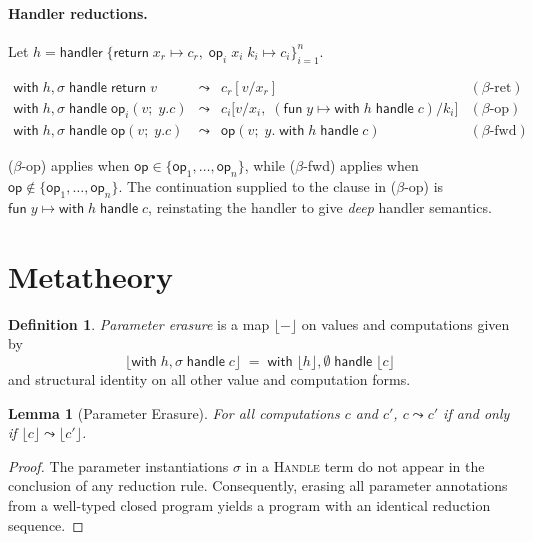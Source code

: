 \documentclass{article}
\newtheorem{lemma}[theorem]{Lemma}
\theoremstyle{definition}
\newtheorem{definition}[theorem]{Definition}
\theoremstyle{remark}
\newcommand{\op}{\mathsf{op}}
\newcommand{\ret}{\mathsf{return}\;}
\newcommand{\fun}{\mathsf{fun}\;}
\newcommand{\hhandler}{\mathsf{handler}}
\newcommand{\with}{\mathsf{with}\;}
\newcommand{\handle}{\;\mathsf{handle}\;}
\begin{document}
\paragraph{Handler reductions.}

Let $h = \hhandler\;\{\ret x_r \mapsto c_r,\;\op_i\;x_i\;k_i \mapsto c_i\}_{i=1}^{n}$.

\[
\begin{array}{lcll}
  \with h, \sigma \handle \ret v
    & \leadsto & c_r[v/x_r]
    & (\beta\text{-ret}) \\[4pt]
    \with h,\sigma \handle \op_i(v;\;y.c)
    & \leadsto & c_i\bigl[v/x_i,\;(\fun y \mapsto \with h \handle c)/k_i\bigr]
    & (\beta\text{-op}) \\[4pt]
  \with h,\sigma \handle \op(v;\;y.c)
    & \leadsto & \op(v;\;y.\;\with h \handle c)
    & (\beta\text{-fwd})
\end{array}
\]

\noindent
($\beta$-op) applies when $\op \in \{\op_1, \ldots, \op_n\}$, while
($\beta$-fwd) applies when $\op \notin \{\op_1, \ldots, \op_n\}$.
The continuation supplied to the clause in ($\beta$-op) is $\fun y \mapsto \with h \handle c$,
reinstating the handler to give \emph{deep} handler semantics.

\section{Metatheory}\label{sec:meta}

\begin{definition}
  \emph{Parameter erasure} is a map $\lfloor - \rfloor$ on values and computations given by
  \[
    \bigl\lfloor \with h, \sigma \handle c \bigr\rfloor
    \;=\;
    \with \lfloor h \rfloor, \emptyset \handle \lfloor c \rfloor
  \]
  and structural identity on all other value and computation forms.
\end{definition}


\begin{lemma}[Parameter Erasure]\label{lem:erasure}
  For all computations $c$ and $c'$,\; $c \leadsto c'$ if and only if $\lfloor c \rfloor \leadsto \lfloor c' \rfloor$.
\end{lemma}

\begin{proof}
  The parameter instantiations $\sigma$ in a \textsc{Handle} term do not appear in
  the conclusion of any reduction rule. Consequently, erasing all parameter annotations
  from a well-typed closed program yields a program with an identical reduction sequence.
\end{proof}
\end{document}
